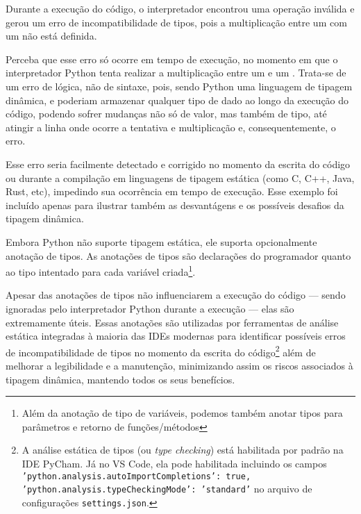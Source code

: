Durante a execução do código, o interpretador encontrou uma operação inválida e gerou um erro de incompatibilidade
de tipos, pois a multiplicação entre um  com um  não está definida.

Perceba que esse erro só ocorre em tempo de execução, no momento em que o interpretador Python tenta realizar a
multiplicação entre um  e um .
Trata-se de um erro de lógica, não de sintaxe, pois, sendo Python uma linguagem de tipagem dinâmica,
 e  poderiam armazenar qualquer tipo de dado ao longo da execução do código,
podendo sofrer mudanças não só de valor, mas também de tipo, até atingir a linha onde ocorre a tentativa e
multiplicação e, consequentemente, o erro.

Esse erro seria facilmente detectado e corrigido no momento da escrita do código ou durante a compilação em
linguagens de tipagem estática (como C, C++, Java, Rust, etc), impedindo sua ocorrência em tempo de execução.
Esse exemplo foi incluído apenas para ilustrar também as desvantágens e os possíveis desafios da tipagem dinâmica.

Embora Python não suporte tipagem estática, ele suporta opcionalmente anotação de tipos.
As anotações de tipos são declarações do programador quanto ao tipo intentado para cada variável
criada\footnote{Além da anotação de tipo de variáveis, podemos também anotar tipos para parâmetros e retorno de
funções/métodos}.

Apesar das anotações de tipos não influenciarem a execução do código --- sendo ignoradas pelo interpretador Python
durante a execução --- elas são extremamente úteis.
Essas anotações são utilizadas por ferramentas de análise estática integradas à maioria das IDEs modernas para
identificar possíveis erros de incompatibilidade de tipos no momento da escrita do
código\footnote{A análise estática de tipos (ou \emph{type checking}) está habilitada por padrão na IDE PyCham.
Já no VS Code, ela pode habilitada incluindo os campos
\texttt{'python.analysis.autoImportCompletions': true,} \texttt{'python.analysis.typeCheckingMode': 'standard'} no arquivo de
configurações \texttt{settings.json}.
}
além de melhorar a legibilidade e a manutenção, minimizando assim os riscos associados à tipagem dinâmica, mantendo
todos os seus benefícios.

